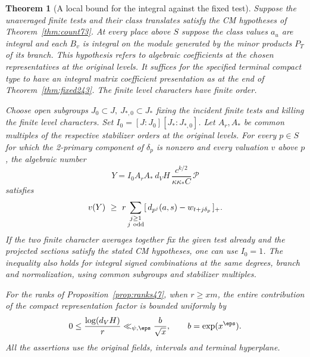 \documentclass[a4paper,11pt]{article}
\newtheorem{theorem}[proposition]{Theorem}
\theoremstyle{definition}
\theoremstyle{remark}
\numberwithin{equation}{section}
\begin{document}
\begin{theorem}[A local bound for the integral against the fixed test]
\label{thm:div243}
Suppose the unaveraged finite tests and their class translates
satisfy the CM hypotheses of Theorem~\ref{thm:count73}. At every
place above \(S\) suppose the class values \(a_u\) are integral
and each \(B_v\) is integral on the module generated by the minor
products \(P_T\) of its branch. This hypothesis refers to algebraic
coefficients at the chosen representatives at the original levels.
It suffices for the specified terminal compact type to have an
integral matrix coefficient presentation as at the end of
Theorem~\ref{thm:fixed243}. The finite level characters have
finite order.

Choose open subgroups \(J_0\subset J,\ J_{*,0}\subset J_*\)
fixing the incident finite tests and killing the finite level
characters. Set \(I_0=[J:J_0][J_*:J_{*,0}]\). Let \(A_r,A_*\)
be common multiples of the respective stabilizer orders at the
original levels. For every \(p\in S\) for which the 2-primary
component of \(\delta_p\) is nonzero and every valuation \(v\)
above \(p\), the algebraic number
\[
 Y=I_0 A_r A_*\, d_V H\,
                \frac{c^{k/2}}{\kappa\kappa_* C}\,\mathcal P
\]
satisfies
\[
 v(Y)\ \ge\
 r\sum_{\substack{j\ge1\\j\ {\rm odd}}}
       [\,d_{p^j}(a,s)-w_{t+j\delta_p}\,]_+ .
\]
If the two finite character averages together fix the given
test already and the projected sections satisfy the stated CM
hypotheses, one can use \(I_0=1\). The inequality also holds
for integral signed combinations at the same degrees, branch
and normalization, using common subgroups and stabilizer multiples.

For the ranks of Proposition~\ref{prop:ranks47}, when \(r\ge xm\),
the entire contribution of the compact representation factor is
bounded uniformly by
\[
                0\le \frac{\log(d_V H)}r
                            \ll_{\psi,\eps}\frac{b}{\sqrt x},
                    \qquad b=\exp(x^\eps).
\]
All the assertions use the original fields, intervals and terminal
hyperplane.
\end{theorem}
\end{document}
